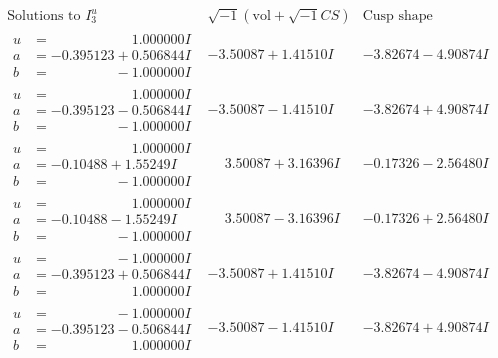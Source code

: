 \documentclass[1p]{elsarticle_modified}
\theoremstyle{definition}
\newcommand{\I}{\sqrt{-1}}
\begin{document}
$$\begin{array}{c|c|c}  
\text{Solutions to }I^u_{3}& \I (\text{vol} + \sqrt{-1}CS) & \text{Cusp shape}\\
 \hline 
\begin{aligned}
u &= \phantom{-0.000000 -}1.000000 I \\
a &= -0.395123 + 0.506844 I \\
b &= \phantom{-0.000000 } -1.000000 I\end{aligned}
 & -3.50087 + 1.41510 I & -3.82674 - 4.90874 I \\ \hline\begin{aligned}
u &= \phantom{-0.000000 -}1.000000 I \\
a &= -0.395123 - 0.506844 I \\
b &= \phantom{-0.000000 } -1.000000 I\end{aligned}
 & -3.50087 - 1.41510 I & -3.82674 + 4.90874 I \\ \hline\begin{aligned}
u &= \phantom{-0.000000 -}1.000000 I \\
a &= -0.10488 + 1.55249 I \\
b &= \phantom{-0.000000 } -1.000000 I\end{aligned}
 & \phantom{-}3.50087 + 3.16396 I & -0.17326 - 2.56480 I \\ \hline\begin{aligned}
u &= \phantom{-0.000000 -}1.000000 I \\
a &= -0.10488 - 1.55249 I \\
b &= \phantom{-0.000000 } -1.000000 I\end{aligned}
 & \phantom{-}3.50087 - 3.16396 I & -0.17326 + 2.56480 I \\ \hline\begin{aligned}
u &= \phantom{-0.000000 } -1.000000 I \\
a &= -0.395123 + 0.506844 I \\
b &= \phantom{-0.000000 -}1.000000 I\end{aligned}
 & -3.50087 + 1.41510 I & -3.82674 - 4.90874 I \\ \hline\begin{aligned}
u &= \phantom{-0.000000 } -1.000000 I \\
a &= -0.395123 - 0.506844 I \\
b &= \phantom{-0.000000 -}1.000000 I\end{aligned}
 & -3.50087 - 1.41510 I & -3.82674 + 4.90874 I \\ \hline\begin{aligned}

\end{aligned}
\end{array}$$
\end{document}
